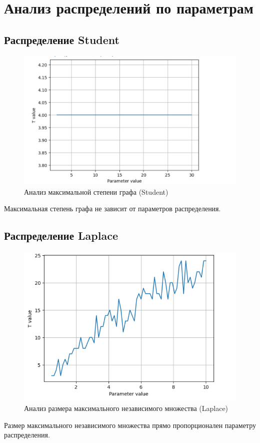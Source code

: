 \documentclass{HSEtitle}
\begin{document}
\section{Анализ распределений по параметрам}

\subsection{Распределение Student}
\begin{figure}[H]
    \centering
    \includegraphics[width=0.7\linewidth]{11.png}
    \caption{Анализ максимальной степени графа (Student)}
    \label{fig:student_param}
\end{figure}
Максимальная степень графа не зависит от параметров распределения.

\subsection{Распределение Laplace}
\begin{figure}[H]
    \centering
    \includegraphics[width=0.7\linewidth]{12.png}
    \caption{Анализ размера максимального независимого множества (Laplace)}
    \label{fig:laplace_param}
\end{figure}
Размер максимального независимого множества прямо пропорционален параметру распределения.
\end{document}
